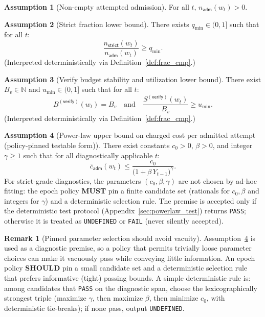 \documentclass[11pt]{article}
\newcommand{\MUST}{\textbf{MUST}}
\newcommand{\SHOULD}{\textbf{SHOULD}}
\newcommand{\N}{\mathbb{N}}
\newcommand{\1}{\mathbf{1}}
\theoremstyle{definition}
\newtheorem{assumption}{Assumption}
\newtheorem{remark}{Remark}
\theoremstyle{plain}
\begin{document}
\begin{assumption}[Non-empty attempted admission]
\label{ass:regime_nonempty}
For all $t$, $n_{\textsf{adm}}(w_t)>0$.
\end{assumption}

\begin{assumption}[Strict fraction lower bound]
\label{ass:qmin}
There exists $q_{\min}\in(0,1]$ such that for all $t$:
\[
\frac{n_{\textsf{strict}}(w_t)}{n_{\textsf{adm}}(w_t)}\ge q_{\min}.
\]
(Interpreted deterministically via Definition~\ref{def:frac_cmp}.)
\end{assumption}

\begin{assumption}[Verify budget stability and utilization lower bound]
\label{ass:util}
There exist $B_v\in\N$ and $u_{\min}\in(0,1]$ such that for all $t$:
\[
B^{(\textsf{verify})}(w_t)=B_v
\quad\text{and}\quad
\frac{S^{(\textsf{verify})}(w_t)}{B_v}\ge u_{\min}.
\]
(Interpreted deterministically via Definition~\ref{def:frac_cmp}.)
\end{assumption}

\begin{assumption}[Power-law upper bound on charged cost per admitted attempt (policy-pinned testable form)]
\label{ass:powerlaw}
There exist constants $c_0>0$, $\beta>0$, and integer $\gamma\ge 1$ such that for all diagnostically applicable $t$:
\[
\bar c_{\textsf{adm}}(w_t)\le \frac{c_0}{\bigl(1+\beta\,Y_{t-1}\bigr)^{\gamma}}.
\]
For strict-grade diagnostics, the parameters $(c_0,\beta,\gamma)$ are not chosen by ad-hoc fitting: the epoch policy \MUST{} pin a finite candidate set (rationals for $c_0,\beta$ and integers for $\gamma$) and a deterministic selection rule. The premise is accepted only if the deterministic test protocol (Appendix~\ref{sec:powerlaw_test}) returns \texttt{PASS}; otherwise it is treated as \texttt{UNDEFINED} or \texttt{FAIL} (never silently accepted).
\end{assumption}

\begin{remark}[Pinned parameter selection should avoid vacuity]
Assumption~\ref{ass:powerlaw} is used as a diagnostic premise, so a policy that permits trivially loose parameter choices can make it vacuously pass while conveying little information.
An epoch policy \SHOULD{} pin a small candidate set and a deterministic selection rule that prefers informative (tight) passing bounds.
A simple deterministic rule is: among candidates that \texttt{PASS} on the diagnostic span, choose the lexicographically strongest triple (maximize $\gamma$, then maximize $\beta$, then minimize $c_0$, with deterministic tie-breaks); if none pass, output \texttt{UNDEFINED}.
\end{remark}
\end{document}
